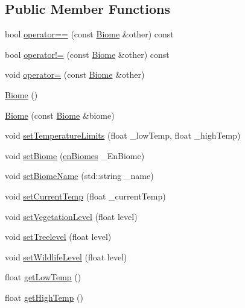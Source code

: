 \subsection*{Public Member Functions}
\begin{DoxyCompactItemize}
\item 
bool \mbox{\hyperlink{class_biome_ab30d25f0400f31071794964de3224b6b}{operator==}} (const \mbox{\hyperlink{class_biome}{Biome}} \&other) const
\item 
bool \mbox{\hyperlink{class_biome_a5f619965ed1bf4b1f7423cbb69be3559}{operator!=}} (const \mbox{\hyperlink{class_biome}{Biome}} \&other) const
\item 
void \mbox{\hyperlink{class_biome_a5a66500c836cefef0f6cf47af93fe3df}{operator=}} (const \mbox{\hyperlink{class_biome}{Biome}} \&other)
\item 
\mbox{\hyperlink{class_biome_aa340fc9737f1f60fe4aa99f5d4d5c726}{Biome}} ()
\item 
\mbox{\hyperlink{class_biome_a6145de7d30bcbef4b6042ee456f88f16}{Biome}} (const \mbox{\hyperlink{class_biome}{Biome}} \&biome)
\item 
void \mbox{\hyperlink{class_biome_acc568302ef1e66d443d2e43d94b36a10}{set\+Temperature\+Limits}} (float \+\_\+low\+Temp, float \+\_\+high\+Temp)
\item 
void \mbox{\hyperlink{class_biome_afb3047918646d9d7717b74091efa378b}{set\+Biome}} (\mbox{\hyperlink{_enum_types_8hpp_a5c2255009cd01c90cf68245e6f453d1c}{en\+Biomes}} \+\_\+\+En\+Biome)
\item 
void \mbox{\hyperlink{class_biome_a4b702cd936eb35364493be9e3e3c4166}{set\+Biome\+Name}} (std\+::string \+\_\+name)
\item 
void \mbox{\hyperlink{class_biome_a73164a278cfd1c3c6cf52a6b006034e0}{set\+Current\+Temp}} (float \+\_\+current\+Temp)
\item 
void \mbox{\hyperlink{class_biome_adbe071450d7411ddd3f886b1c84c2029}{set\+Vegetation\+Level}} (float level)
\item 
void \mbox{\hyperlink{class_biome_adb9f34f853f233464a33a5dfbb2ccbee}{set\+Treelevel}} (float level)
\item 
void \mbox{\hyperlink{class_biome_afe05b01787008c396ccad3ffd7e6d6cd}{set\+Wildlife\+Level}} (float level)
\item 
float \mbox{\hyperlink{class_biome_a198f0bb873cce52c8e62df2cf0282e84}{get\+Low\+Temp}} ()
\item 
float \mbox{\hyperlink{class_biome_afc882c431129cdaae8109ad5dcc8267e}{get\+High\+Temp}} ()
\item 

\end{DoxyCompactItemize}
